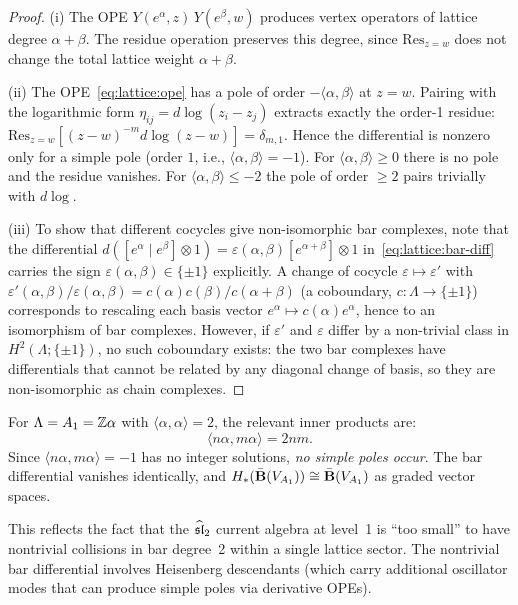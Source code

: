 \begin{proof}
(i) The OPE $Y(e^\alpha, z)\,Y(e^\beta, w)$ produces vertex operators
of lattice degree $\alpha + \beta$. The residue operation preserves
this degree, since $\mathrm{Res}_{z=w}$ does not change the total lattice
weight $\alpha + \beta$.

(ii) The OPE~\eqref{eq:lattice:ope} has a pole of order
$-\langle\alpha,\beta\rangle$ at $z = w$. Pairing with the logarithmic
form $\eta_{ij} = d\log(z_i - z_j)$ extracts exactly the order-1 residue:
$\mathrm{Res}_{z=w}[(z-w)^{-m} d\log(z-w)] = \delta_{m,1}$.
Hence the differential is nonzero only for a simple pole (order $1$,
i.e., $\langle\alpha,\beta\rangle = -1$).  For $\langle\alpha,\beta\rangle \geq 0$
there is no pole and the residue vanishes.  For $\langle\alpha,\beta\rangle \leq -2$
the pole of order $\geq 2$ pairs trivially with $d\log$.

(iii) To show that different cocycles give non-isomorphic bar complexes,
note that the differential $d([e^\alpha \mid e^\beta] \otimes 1) = \varepsilon(\alpha,\beta)[e^{\alpha+\beta}]\otimes 1$
in~\eqref{eq:lattice:bar-diff} carries the sign $\varepsilon(\alpha,\beta) \in \{\pm 1\}$
explicitly.  A change of cocycle $\varepsilon \mapsto \varepsilon'$ with
$\varepsilon'(\alpha,\beta)/\varepsilon(\alpha,\beta) = c(\alpha)c(\beta)/c(\alpha+\beta)$
(a coboundary, $c: \Lambda \to \{\pm 1\}$) corresponds to rescaling each basis vector
$e^\alpha \mapsto c(\alpha)e^\alpha$, hence to an isomorphism of bar complexes.
However, if $\varepsilon'$ and $\varepsilon$ differ by a non-trivial class in
$H^2(\Lambda;\{\pm 1\})$, no such coboundary exists: the two bar complexes have
differentials that cannot be related by any diagonal change of basis, so they are
non-isomorphic as chain complexes.
\end{proof}

\begin{computation}\label{comp:lattice:bar-A1}
For $\Lambda = A_1 = \mathbb{Z}\alpha$ with $\langle\alpha,\alpha\rangle = 2$,
the relevant inner products are:
\[
\langle n\alpha, m\alpha \rangle = 2nm.
\]
Since $\langle n\alpha, m\alpha\rangle = -1$ has no integer solutions,
\emph{no simple poles occur}. The bar differential vanishes identically,
and $H_*(\bar{\mathbf{B}}(V_{A_1})) \cong \bar{\mathbf{B}}(V_{A_1})$ as
graded vector spaces.

This reflects the fact that the $\widehat{\mathfrak{sl}}_2$ current algebra at
level~1 is ``too small'' to have nontrivial collisions in bar degree~2
within a single lattice sector. The nontrivial bar differential involves
Heisenberg descendants (which carry additional oscillator modes that can
produce simple poles via derivative OPEs).
\end{computation}


